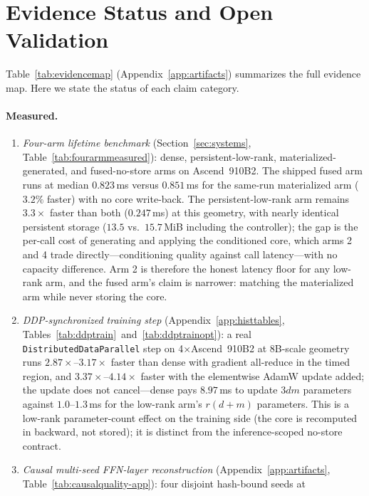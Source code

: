 \section{Evidence Status and Open Validation}
\label{sec:results}

Table~\ref{tab:evidencemap} (Appendix~\ref{app:artifacts}) summarizes the
full evidence map. Here we state the status of each claim category.

\paragraph{Measured.}
\begin{enumerate}
  \item \emph{Four-arm lifetime benchmark} (Section~\ref{sec:systems},
    Table~\ref{tab:fourarmmeasured}): dense, persistent-low-rank,
    materialized-generated, and fused-no-store arms on Ascend~910B2.
    The shipped fused arm runs at median $0.823$\,ms versus $0.851$\,ms for
    the same-run materialized arm ($3.2\%$ faster) with no core write-back.
    The persistent-low-rank arm remains $3.3\times$ faster than both
    ($0.247$\,ms) at this geometry, with nearly identical persistent
    storage ($13.5$ vs.\ $15.7$\,MiB including the controller); the gap is
    the per-call cost of generating and applying the conditioned core,
    which arms 2 and 4 trade directly---conditioning quality against
    call latency---with no capacity difference.  Arm 2 is therefore the
    honest latency floor for any low-rank arm, and the fused arm's claim
    is narrower: matching the materialized arm while never storing the
    core.
  \item \emph{DDP-synchronized training step} (Appendix~\ref{app:histtables},
    Tables~\ref{tab:ddptrain}~and~\ref{tab:ddptrainopt}): a real
    \texttt{DistributedDataParallel} step on 4$\times$Ascend~910B2 at 8B-scale
    geometry runs $2.87\times$--$3.17\times$ faster than dense with gradient
    all-reduce in the timed region, and $3.37\times$--$4.14\times$ faster with
    the elementwise AdamW update added; the update does not cancel---dense
    pays $8.97$\,ms to update $3dm$ parameters against $1.0$--$1.3$\,ms for
    the low-rank arm's $r(d{+}m)$ parameters.  This is a low-rank
    parameter-count effect on the training side (the core is recomputed in
    backward, not stored); it is distinct from the inference-scoped
    no-store contract.
  \item \emph{Causal multi-seed FFN-layer reconstruction} (Appendix~\ref{app:artifacts},
    Table~\ref{tab:causalquality-app}): four disjoint hash-bound seeds at

\end{enumerate}
